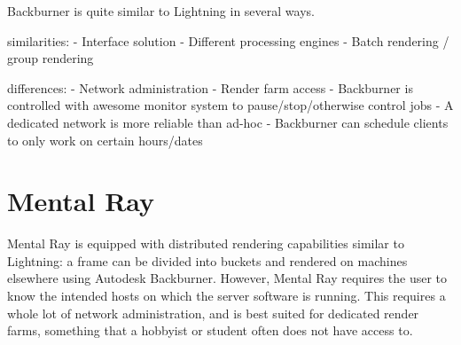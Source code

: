Backburner is quite similar to Lightning in several ways. 

similarities:
- Interface solution
- Different processing engines
- Batch rendering / group rendering

differences: 
- Network administration
- Render farm access
- Backburner is controlled with awesome monitor system to pause/stop/otherwise control jobs
- A dedicated network is more reliable than ad-hoc
- Backburner can schedule clients to only work on certain hours/dates

\section{Mental Ray}


Mental Ray is equipped with distributed rendering capabilities similar to Lightning: a frame can be divided into buckets and rendered on machines elsewhere using Autodesk Backburner. However, Mental Ray requires the user to know the intended hosts on which the server software is running. This requires a whole lot of network administration, and is best suited for dedicated render farms, something that a hobbyist or student often does not have access to. 
